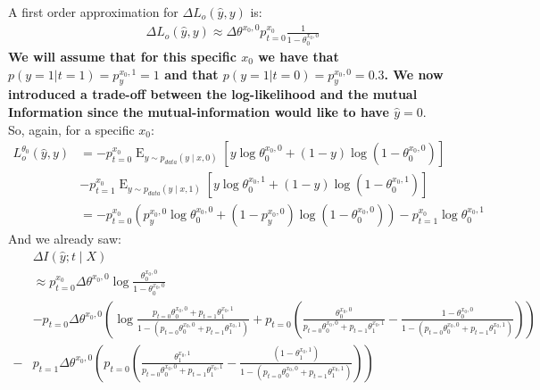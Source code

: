 \documentclass[oneside,12pt]{article}
\begin{document}
%
A first order approximation for $\Delta L_o(\hat{y}, y)$ is:
\begin{equation}
    \begin{split}
        \Delta L_o(\hat{y}, y) \approx \Delta\theta^{x_0,0} p^{x_0}_{t=0} \frac{1}{1-\theta_0^{x_0,0}}
    \end{split}
\end{equation}
%
\textbf{We will assume that for this specific $x_0$ we have that $p(y=1 | t=1) = p_y^{x_0,1} = 1$ and that $p(y=1 | t=0) = p_y^{x_0,0} = 0.3$. We now introduced a trade-off between the log-likelihood and the mutual Information since the mutual-information would like to have $\hat{y}=0$}.\\
%
So, again, for a specific $x_0$:
%
\begin{equation*}
    \begin{split}
        L^{\theta_0}_o(\hat{y}, y) &= -p^{x_0}_{t=0} \operatorname{E}_{y \sim p_{data}(y \mid x,0)}\left[y \operatorname{log}\theta_0^{x_0,0} + (1-y)\operatorname{log}(1-\theta_0^{x_0,0})\right]\\
        &- p^{x_0}_{t=1} \operatorname{E}_{y \sim p_{data}(y \mid x,1)}\left[y \operatorname{log}\theta_0^{x_0,1} + (1-y)\operatorname{log}(1-\theta_0^{x_0,1})\right]\\
        &= -p^{x_0}_{t=0}\left(p_y^{x_0,0} \operatorname{log}\theta_0^{x_0,0} + (1-p_y^{x_0,0})\operatorname{log}(1-\theta_0^{x_0,0})\right) - p^{x_0}_{t=1}\operatorname{log}\theta_0^{x_0,1}
    \end{split}
\end{equation*}
%
And we already saw:
\begin{equation*}
    \begin{split}
        &\Delta I(\hat{y};t \mid X)\\
        &\approx p^{x_0}_{t=0}\Delta\theta^{x_0,0} \operatorname{log}\frac{\theta_0^{x_0,0}}{1-\theta_0^{x_0,0}}\\
        &- p_{t=0}\Delta\theta^{x_0,0}\left(\operatorname{log}\frac{p_{t=0}\theta_0^{x_0,0}+p_{t=1}\theta_1^{x_0,1}}{1-(p_{t=0}\theta_0^{x_0,0}+p_{t=1}\theta_1^{x_0,1})}+ p_{t=0}\left(
        \frac{\theta_0^{x_0,0}}{p_{t=0}\theta_0^{x_0,0}+p_{t=1}\theta_1^{x_0,1}} - \frac{1-\theta_0^{x_0,0}}{1-(p_{t=0}\theta_0^{x_0,0}+p_{t=1}\theta_1^{x_0,1})}\right)\right)\\ 
        -& p_{t=1}\Delta\theta^{x_0,0}\left(p_{t=0}\left(\frac{\theta_1^{x_0,1}}{p_{t=0}\theta_0^{x_0,0} +p_{t=1}\theta_1^{x_0,1}}-\frac{(1-\theta_1^{x_0,1})}{1-(p_{t=0}\theta_0^{x_0,0}+p_{t=1}\theta_1^{x_0,1})}\right)\right)
    \end{split}
\end{equation*}
\end{document}

